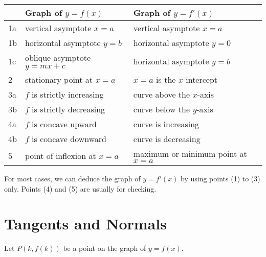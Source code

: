 \begin{table}[H]
    \centering
    \begin{tabularx}{\textwidth}{|l|>{\centering\arraybackslash}X|>{\centering\arraybackslash}X|}
        \hline
         & Graph of $y = f(x)$ & Graph of $y = f'(x)$ \\ \hline
        1a & vertical asymptote $x = a$ & vertical asymptote $x = a$ \\ \hline
        1b & horizontal asymptote $y = b$ & horizontal asymptote $y = 0$ \\ \hline
        1c & oblique asymptote $y = mx + c$ & horizontal asymptote $y = b$ \\ \hline
        2 & stationary point at $x = a$ & $x= a$ is the $x$-intercept \\ \hline
        3a & $f$ is strictly increasing & curve above the $x$-axis \\ \hline
        3b & $f$ is strictly decreasing & curve below the $y$-axis \\ \hline 
        4a & $f$ is concave upward & curve is increasing \\ \hline
        4b & $f$ is concave downward & curve is decreasing \\ \hline
        5 & point of inflexion at $x = a$ & maximum or minimum point at $x = a$ \\ \hline
    \end{tabularx}
\end{table}

For most cases, we can deduce the graph of $y = f'(x)$ by using points (1) to (3) only. Points (4) and (5) are usually for checking.

\section{Tangents and Normals}

Let $P(k, f(k))$ be a point on the graph of $y = f(x)$.

